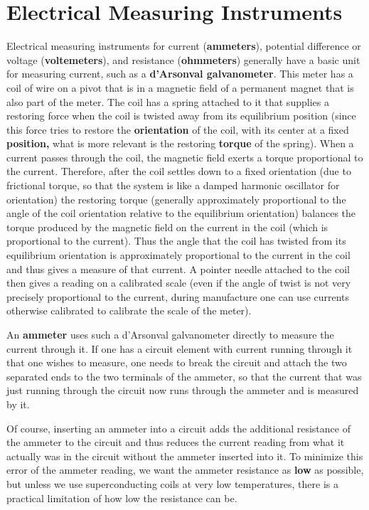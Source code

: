 \section{Electrical Measuring Instruments}
Electrical measuring instruments for current (\textbf{ammeters}), potential difference or voltage (\textbf{voltemeters}), and resistance (\textbf{ohmmeters}) generally have a basic unit for measuring current, such as a \textbf{d'Arsonval galvanometer}. This meter has a coil of wire on a pivot that is in a magnetic field of a permanent magnet that is also part of the meter. The coil has a spring attached to it that supplies a restoring force when the coil is twisted away from its equilibrium position (since this force tries to restore the \textbf{orientation} of the coil, with its center at a fixed \textbf{position,} what is more relevant is the restoring \textbf{torque} of the spring). When a current passes through the coil, the magnetic field exerts a torque proportional to the current. Therefore, after the coil settles down to a fixed orientation (due to frictional torque, so that the system is like a damped harmonic oscillator for orientation) the restoring torque (generally approximately proportional to the angle of the coil orientation relative to the equilibrium orientation) balances the torque produced by the magnetic field on the current in the coil (which is proportional to the current). Thus the angle that the coil has twisted from its equilibrium orientation is approximately proportional to the current in the coil and thus gives a measure of that current. A pointer needle attached to the coil then gives a reading on a calibrated scale (even if the angle of twist is not very precisely proportional to the current, during manufacture one can use currents otherwise calibrated to calibrate the scale of the meter).

An \textbf{ammeter} uses such a d'Arsonval galvanometer directly to measure the current through it. If one has a circuit element with current running through it that one wishes to measure, one needs to break the circuit and attach the two separated ends to the two terminals of the ammeter, so that the current that was just running through the circuit now runs through the ammeter and is measured by it.

Of course, inserting an ammeter into a circuit adds the additional resistance of the ammeter to the circuit and thus reduces the current reading from what it actually was in the circuit without the ammeter inserted into it. To minimize this error of the ammeter reading, we want the ammeter resistance as \textbf{low} as possible, but unless we use superconducting coils at very low temperatures, there is a practical limitation of how low the resistance can be.

